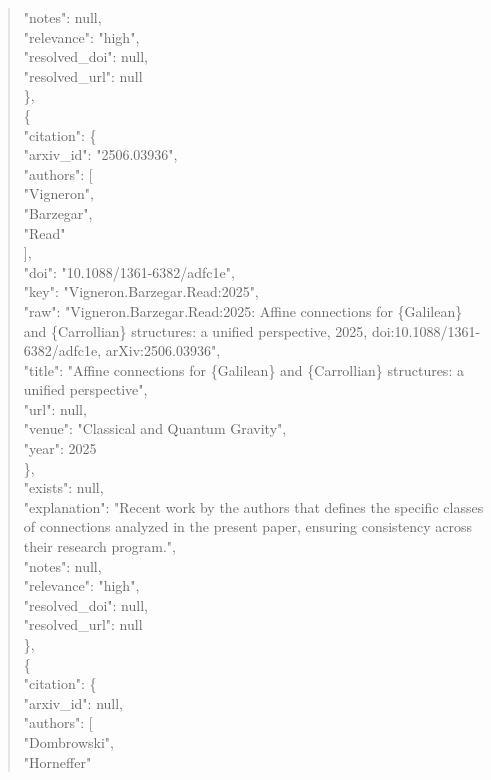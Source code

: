 \documentclass[11pt]{article}
\begin{document}
\begin{quote}
      "notes": null,\\
      "relevance": "high",\\
      "resolved\_doi": null,\\
      "resolved\_url": null\\
    \},\\
    \{\\
      "citation": \{\\
        "arxiv\_id": "2506.03936",\\
        "authors": [\\
          "Vigneron",\\
          "Barzegar",\\
          "Read"\\
        ],\\
        "doi": "10.1088/1361-6382/adfc1e",\\
        "key": "Vigneron.Barzegar.Read:2025",\\
        "raw": "Vigneron.Barzegar.Read:2025: Affine connections for \{Galilean\} and \{Carrollian\} structures: a unified perspective, 2025, doi:10.1088/1361-6382/adfc1e, arXiv:2506.03936",\\
        "title": "Affine connections for \{Galilean\} and \{Carrollian\} structures: a unified perspective",\\
        "url": null,\\
        "venue": "Classical and Quantum Gravity",\\
        "year": 2025\\
      \},\\
      "exists": null,\\
      "explanation": "Recent work by the authors that defines the specific classes of connections analyzed in the present paper, ensuring consistency across their research program.",\\
      "notes": null,\\
      "relevance": "high",\\
      "resolved\_doi": null,\\
      "resolved\_url": null\\
    \},\\
    \{\\
      "citation": \{\\
        "arxiv\_id": null,\\
        "authors": [\\
          "Dombrowski",\\
          "Horneffer"\\

\end{quote}
\end{document}
